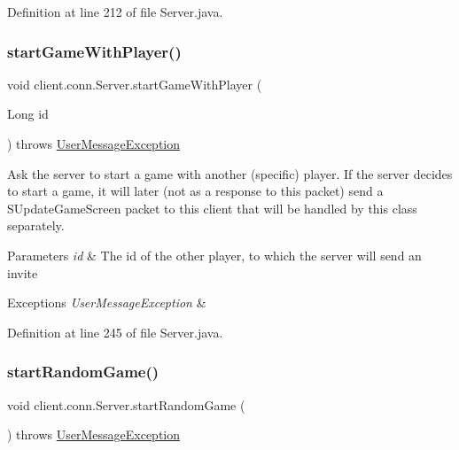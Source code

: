 Definition at line 212 of file Server.\+java.

\hypertarget{classclient_1_1conn_1_1_server_a6336de53822bd12d42e8445a598f2838}{}\label{classclient_1_1conn_1_1_server_a6336de53822bd12d42e8445a598f2838} 
\subsubsection{\texorpdfstring{start\+Game\+With\+Player()}{startGameWithPlayer()}}
{\footnotesize\ttfamily void client.\+conn.\+Server.\+start\+Game\+With\+Player (\begin{DoxyParamCaption}\item[{Long}]{id }\end{DoxyParamCaption}) throws \hyperlink{classpt_1_1up_1_1fe_1_1lpro1613_1_1sharedlib_1_1exceptions_1_1_user_message_exception}{User\+Message\+Exception}}

Ask the server to start a game with another (specific) player. If the server decides to start a game, it will later (not as a response to this packet) send a S\+Update\+Game\+Screen packet to this client that will be handled by this class separately. 
\begin{DoxyParams}{Parameters}
{\em id} & The id of the other player, to which the server will send an invite \\
\hline
\end{DoxyParams}

\begin{DoxyExceptions}{Exceptions}
{\em User\+Message\+Exception} & \\
\hline
\end{DoxyExceptions}


Definition at line 245 of file Server.\+java.

\hypertarget{classclient_1_1conn_1_1_server_afbeea330d5f40a6edd87387fa71bcc2d}{}\label{classclient_1_1conn_1_1_server_afbeea330d5f40a6edd87387fa71bcc2d} 
\subsubsection{\texorpdfstring{start\+Random\+Game()}{startRandomGame()}}
{\footnotesize\ttfamily void client.\+conn.\+Server.\+start\+Random\+Game (\begin{DoxyParamCaption}{ }\end{DoxyParamCaption}) throws \hyperlink{classpt_1_1up_1_1fe_1_1lpro1613_1_1sharedlib_1_1exceptions_1_1_user_message_exception}{User\+Message\+Exception}}

